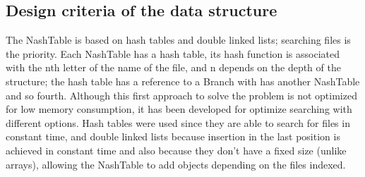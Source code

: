 \documentclass{sig-alternate-05-2015}
\begin{document}
  \subsection{Design criteria of the data structure}
    The NashTable is based on hash tables and double linked lists; searching files
    is the priority. Each NashTable has a hash table, its hash function is associated with the
    nth letter of the name of the file, and n depends on the depth of the structure;
    the hash table has a reference to a Branch with has another NashTable and so fourth.
    Although this first approach to solve the problem is not optimized for low memory consumption,
    it has been developed for optimize searching with different options. Hash tables were used since
    they are able to search for files in constant time, and double linked lists because insertion in the last position is achieved in constant time
    and also because they don't have a fixed size (unlike arrays), allowing the NashTable to add objects depending on the files indexed.
\end{document}
